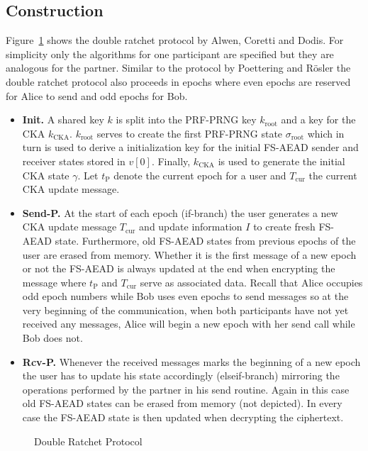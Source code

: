 \documentclass[11pt,a4paper,twoside,openright,bibliography=totoc]{scrbook}
\renewcommand{\t}{\text} %
\begin{document}
\subsection{Construction}
\label{sec:construction-4}

Figure~\ref{fig:double-ratchet} shows the double ratchet protocol by
Alwen, Coretti and Dodis. For simplicity only the algorithms
for one participant are specified but they are analogous for
the partner. Similar to the protocol by Poettering and Rösler
the double ratchet protocol also proceeds in epochs where
even epochs are reserved for Alice to send and odd epochs for Bob.
\begin{itemize}
\item \textbf{Init.} A shared key $k$ is split into the PRF-PRNG key
  $k_\t{root}$ and a key for the CKA $k_\t{CKA}$. $k_\t{root}$ serves
  to create the first PRF-PRNG state $\sigma_\t{root}$ which in
  turn is used to derive a initialization key for the initial
  FS-AEAD sender and receiver states stored in $v[0]$. Finally,
  $k_\t{CKA}$ is used to generate the initial CKA state $\gamma$. Let
  $t_\t{P}$ denote the current epoch for a user and $T_\t{cur}$ the
  current CKA update message.
\item \textbf{Send-P.} At the start of each epoch (if-branch) the user
  generates a new CKA update message $T_\t{cur}$ and update information $I$
  to create fresh FS-AEAD state. Furthermore, old FS-AEAD states from previous
  epochs of the user are erased from memory.
  Whether it is the first message of a new epoch or not the FS-AEAD is
  always updated at the end when encrypting
  the message where $t_\t{P}$ and $T_\t{cur}$ serve as associated data.
  Recall that Alice occupies odd epoch numbers while Bob uses even
  epochs to send messages so at the very beginning of the communication, when both
  participants have not yet received any messages, Alice
  will begin a new epoch with her send call while Bob does not.
\item \textbf{Rcv-P.} Whenever the received messages marks the beginning
  of a new epoch the user has to update his state accordingly (elseif-branch)
  mirroring the operations performed by the partner in his send
  routine. Again in this case old FS-AEAD states can be erased
  from memory (not depicted). In every case the FS-AEAD state
  is then updated when decrypting the ciphertext.
\end{itemize}

\begin{figure}[ht]
  \centering
  \setlength{\fboxsep}{10pt}
  \scalebox{0.9}{%
    \fbox{%
      
    }
  }
  \caption{Double Ratchet Protocol}
  \label{fig:double-ratchet}
\end{figure}
\end{document}

